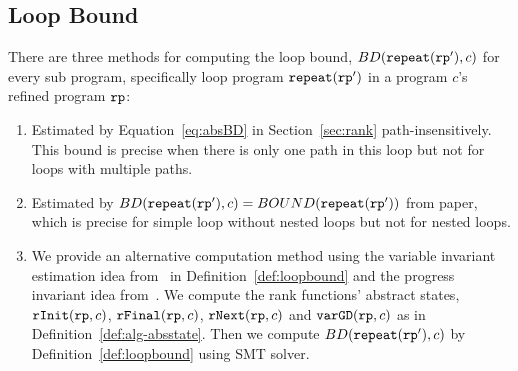 
\subsection{Loop Bound}
There are three methods for computing the loop bound, $BD(\mathtt{repeat}(\mathtt{rp}'), c)$ for every sub program, specifically loop program $\mathtt{repeat}(\mathtt{rp}')$ in a program $c$'s refined program $\mathtt{rp}$:
\begin{enumerate}
  \item Estimated by Equation~\ref{eq:absBD} in Section~\ref{sec:rank} path-insensitively. This bound is precise when there is only one path in this loop but not for loops with multiple paths.
  \item Estimated by $BD(\mathtt{repeat}(\mathtt{rp}'), c) = BOUND(\mathtt{repeat}(\mathtt{rp}'))$ from paper\cite{GulwaniJK09}, which is precise for simple loop without nested loops but not for nested loops. 
  \item   We provide an alternative computation method using the variable invariant estimation idea from~\cite{sinn2017complexity} in Definition~\ref{def:loopbound} and the progress invariant idea from~\cite{GulwaniJK09}.
  We compute the rank functions' abstract states, $\mathtt{rInit}(\mathtt{rp}, c)$, $\mathtt{rFinal}(\mathtt{rp}, c)$, $\mathtt{rNext}(\mathtt{rp}, c)$ and $\mathtt{varGD}(\mathtt{rp}, c)$ as in Definition~\ref{def:alg-absstate}.
  Then we compute $BD(\mathtt{repeat}(\mathtt{rp}'), c)$ by Definition~\ref{def:loopbound} using SMT solver.
\end{enumerate}
%
